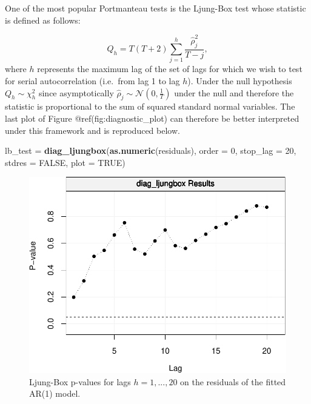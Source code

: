\documentclass[]{book}
\newenvironment{Shaded}{\begin{snugshade}}{\end{snugshade}}
\newcommand{\KeywordTok}[1]{\textcolor[rgb]{0.13,0.29,0.53}{\textbf{#1}}}
\newcommand{\DataTypeTok}[1]{\textcolor[rgb]{0.13,0.29,0.53}{#1}}
\newcommand{\DecValTok}[1]{\textcolor[rgb]{0.00,0.00,0.81}{#1}}
\newcommand{\StringTok}[1]{\textcolor[rgb]{0.31,0.60,0.02}{#1}}
\newcommand{\OtherTok}[1]{\textcolor[rgb]{0.56,0.35,0.01}{#1}}
\newcommand{\NormalTok}[1]{#1}
\theoremstyle{definition}
\theoremstyle{definition}
\theoremstyle{definition}
\theoremstyle{remark}
\begin{document}
One of the most popular Portmanteau tests is the Ljung-Box test whose
statistic is defined as follows:

\[Q_h = T(T+2) \sum_{j=1}^{h} \frac{\hat{\rho}_j^2}{T - j},\] where
\(h\) represents the maximum lag of the set of lags for which we wish to
test for serial autocorrelation (i.e.~from lag 1 to lag \(h\)). Under
the null hypothesis \(Q_h \sim \chi_h^2\) since asymptotically
\(\hat{\rho}_j \sim \mathcal{N}\left(0, \frac{1}{T}\right)\) under the
null and therefore the statistic is proportional to the sum of squared
standard normal variables. The last plot of Figure
@ref(fig:diagnostic\_plot) can therefore be better interpreted under
this framework and is reproduced below.

\begin{Shaded}
\begin{Highlighting}[]
\NormalTok{lb_test =}\StringTok{ }\KeywordTok{diag_ljungbox}\NormalTok{(}\KeywordTok{as.numeric}\NormalTok{(residuals), }\DataTypeTok{order =} \DecValTok{0}\NormalTok{, }\DataTypeTok{stop_lag =} \DecValTok{20}\NormalTok{, }\DataTypeTok{stdres =} \OtherTok{FALSE}\NormalTok{, }\DataTypeTok{plot =} \OtherTok{TRUE}\NormalTok{)}
\end{Highlighting}
\end{Shaded}

\begin{figure}

{\centering \includegraphics{ts_files/figure-latex/unnamed-chunk-49-1} 

}

\caption{Ljung-Box p-values for lags $h = 1,...,20$ on the residuals of the fitted AR(1) model.}\label{fig:unnamed-chunk-49}
\end{figure}
\end{document}
